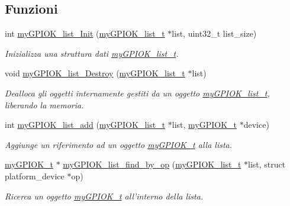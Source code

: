 \subsection*{Funzioni}
\begin{DoxyCompactItemize}
\item 
int \hyperlink{group___device_list_ga1051095fc78c8ba7cf0b20a20fa253d2}{my\+G\+P\+I\+O\+K\+\_\+list\+\_\+\+Init} (\hyperlink{structmy_g_p_i_o_k__list__t}{my\+G\+P\+I\+O\+K\+\_\+list\+\_\+t} $\ast$list, uint32\+\_\+t list\+\_\+size)
\begin{DoxyCompactList}\small\item\em Inizializza una struttura dati \hyperlink{structmy_g_p_i_o_k__list__t}{my\+G\+P\+I\+O\+K\+\_\+list\+\_\+t}. \end{DoxyCompactList}\item 
void \hyperlink{group___device_list_ga416dfff8f4bf6034c87d60968056c621}{my\+G\+P\+I\+O\+K\+\_\+list\+\_\+\+Destroy} (\hyperlink{structmy_g_p_i_o_k__list__t}{my\+G\+P\+I\+O\+K\+\_\+list\+\_\+t} $\ast$list)
\begin{DoxyCompactList}\small\item\em Dealloca gli oggetti internamente gestiti da un oggetto \hyperlink{structmy_g_p_i_o_k__list__t}{my\+G\+P\+I\+O\+K\+\_\+list\+\_\+t}, liberando la memoria. \end{DoxyCompactList}\item 
int \hyperlink{group___device_list_gac5048cf2dbbbce3c39485e15595e88c9}{my\+G\+P\+I\+O\+K\+\_\+list\+\_\+add} (\hyperlink{structmy_g_p_i_o_k__list__t}{my\+G\+P\+I\+O\+K\+\_\+list\+\_\+t} $\ast$list, \hyperlink{structmy_g_p_i_o_k__t}{my\+G\+P\+I\+O\+K\+\_\+t} $\ast$device)
\begin{DoxyCompactList}\small\item\em Aggiunge un riferimento ad un oggetto \hyperlink{structmy_g_p_i_o_k__t}{my\+G\+P\+I\+O\+K\+\_\+t} alla lista. \end{DoxyCompactList}\item 
\hyperlink{structmy_g_p_i_o_k__t}{my\+G\+P\+I\+O\+K\+\_\+t} $\ast$ \hyperlink{group___device_list_ga616aa45c32b2ff391fc2b89930d1141b}{my\+G\+P\+I\+O\+K\+\_\+list\+\_\+find\+\_\+by\+\_\+op} (\hyperlink{structmy_g_p_i_o_k__list__t}{my\+G\+P\+I\+O\+K\+\_\+list\+\_\+t} $\ast$list, struct platform\+\_\+device $\ast$op)
\begin{DoxyCompactList}\small\item\em Ricerca un oggetto \hyperlink{structmy_g_p_i_o_k__t}{my\+G\+P\+I\+O\+K\+\_\+t} all'interno della lista. \end{DoxyCompactList}\item 

\end{DoxyCompactItemize}
